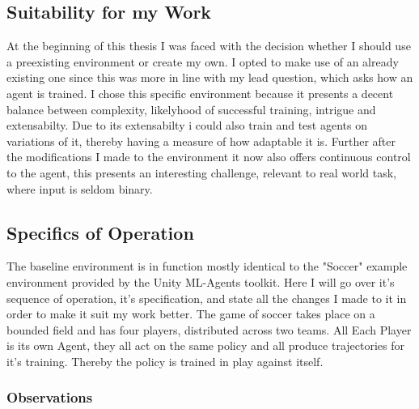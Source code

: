 \subsection{Suitability for my Work}\label{subsec:ip:environment:suitabilty}
At the beginning of this thesis I was faced with the decision whether I should use a preexisting environment or create my own. I opted to make use of an already existing one since this was more in line with my lead question, which asks how an agent is trained. I chose this specific environment because it presents a decent balance between complexity, likelyhood of successful training, intrigue and extensabilty. Due to its extensabilty i could also train and test agents on variations of it, thereby having a measure of how adaptable it is. Further after the modifications I made to the environment it now also offers continuous control to the agent, this presents an interesting challenge, relevant to real world task, where input is seldom binary.

\subsection{Specifics of Operation}\label{subsec:ip:environment:implementation}
The baseline environment is in function mostly identical to the "Soccer" example environment provided by the Unity ML-Agents toolkit. Here I will go over it's sequence of operation, it's specification, and state all the changes I made to it in order to make it suit my work better. The game of soccer takes place on a bounded field and has four players, distributed across two teams. All Each Player is its own Agent, they all act on the same policy and all produce trajectories for it's training. Thereby the policy is trained in play against itself. 

\newpage

\subsubsection{Observations}\label{subsubsec:ip:environment:impl:observations}

